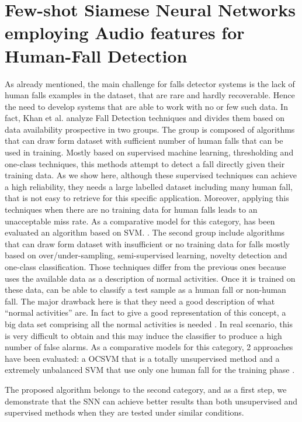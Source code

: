 \section{Few-shot Siamese Neural Networks employing Audio features
for Human-Fall Detection}
\label{sec:siamese_few_shot}
As already mentioned, the main challenge for falls detector systems is the lack of human falls examples in the dataset, that are rare and hardly recoverable. Hence the need to develop systems that are able to work with no or few such data. In fact, Khan et al. \cite{khan2017review} analyze Fall Detection techniques and divides them based on data availability prospective in two groups. The group is composed of algorithms that can draw form dataset with sufficient number of human falls that can be used in training. Mostly based on supervised machine learning, thresholding and one-class techniques, this methods attempt to detect a fall directly given their training data. As we show here, although these supervised techniques can achieve a high reliability, they needs a large labelled dataset including many human fall, that is not easy to retrieve for this specific application. Moreover, applying this techniques when there are no training data for human falls leads to an unacceptable miss rate. As a comparative model for this category, has been evaluated an algorithm based on SVM.%
. The second group include algorithms that can draw form dataset with insufficient or no training data for falls mostly based on over/under-sampling, semi-supervised learning, novelty detection and one-class classification. Those techniques differ from the previous ones because uses the available data as a description of normal activities. Once it is trained on these data, can be able to classify a test sample as a human fall or non-human fall. The major drawback here is that they need a good description of what ``normal activities'' are. In fact to give a good representation of this concept, a big data set comprising all the normal activities is needed \cite{pimentel2014review}. In real scenario, this is very difficult to obtain and this may induce the classifier to produce a high number of false alarms. As a comparative models for this category, 2 approaches have been evaluated: a OCSVM that is a totally unsupervised method and a extremely unbalanced SVM that use only one human fall for the training phase%
.

The proposed algorithm belongs to the second category, and as a first step, we demonstrate that the SNN can achieve better results than both unsupervised and supervised methods when they are tested under similar conditions.


